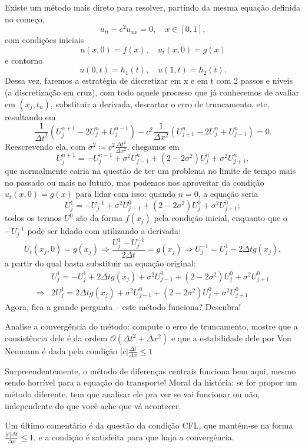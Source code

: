 \documentclass[../differential_methods.tex]{subfiles}
\begin{document}
Existe um método mais direto para resolver, partindo da mesma equação definida no começo,
\[
	u_{tt} - c^{2}u_{xx} = 0, \quad x\in [0, 1],
\]
com condições iniciais
\[
	u(x, 0) = f(x),\quad  u_{t}(x, 0) = g(x)
\]
e contorno
\[
	u(0, t) = h_1(t), \quad u(1, t)=h_2(t).
\]
Dessa vez, faremos a estratégia de discretizar em x e em t com 2 passos e níveis (a discretização em cruz), com todo aquele processo que já conhecemos de avaliar em \((x_{j}, t_{n})\), substituir a derivada, descartar o erro de truncamento, etc, resultando em
\[
	\frac{1}{\Delta t^{2}}(U_{j}^{n+1} - 2 U_{j}^{n} + U_{j}^{n-1}) - c^{2} \frac{1}{\Delta x^{2}}(U_{j+1}^{n}-2U_{j}^{n} + U_{j-1}^{n}) = 0.
\]
Reescrevendo ela, com \(\sigma^{2} \coloneqq c^{2}\frac{\Delta t^{2}}{\Delta x^{2}}\), chegamos em
\[
	U_{j}^{n+1} = -U_{j}^{n-1} + \sigma^{2}U_{j-1}^{n} + (2-2\sigma ^{2})U_{j}^{n} + \sigma^{2}U_{j+1}^{n},
\]
que normalmente cairia na questão de ter um problema no limite de tempo mais no passado ou mais no futuro, mas podemos nos aproveitar da condição \(u_t(x, 0) = g(x)\) para lidar com isso: quando \(n=0\), a equação seria
\[
	U_{j}^{1} = - U_{j}^{-1} + \sigma^{2} U_{j-1}^{0} + (2-2\sigma^{2})U_{j}^{0} + \sigma^{2}U_{j+1}^{0};
\]
todos os termos \(U^{0}\) são da forma \(f(x_{j})\) pela condição inicial, enquanto que o \(-U_{j}^{-1}\) pode ser lidado com utilizando a derivada:
\[
	U_t(x_{j}, 0) = g(x_{j}) \Rightarrow \frac{U_{j}^{1} - U_{j}^{-1}}{2\Delta t} = g(x_{j}) \Rightarrow U_{j}^{-1} = U_{j}^{1} - 2\Delta tg(x_{j}),
\]
a partir do qual basta substituir na equação original:
\begin{align*}
	            & U_{j}^{1} = - U_{j}^{1} + 2\Delta tg(x_{j}) + \sigma^{2} U_{j-1}^{0} + (2-2\sigma^{2})U_{j}^{0} + \sigma^{2}U_{j+1}^{0} \\
	\Rightarrow & \boxed{2U_{j}^{1} = 2\Delta tg(x_{j}) + \sigma^{2} U_{j-1}^{0} + (2-2\sigma^{2})U_{j}^{0} + \sigma^{2} U_{j+1}^{0}}
\end{align*}
Agora, fica a grande pergunta -- este método funciona? Descubra!
\begin{exr}
	Analise a convergência do método: compute o erro de truncamento, mostre que a consistência dele é da ordem \(\mathcal{O}(\Delta t^{2}+\Delta x^{2})\) e que a estabilidade dele por Von Neumann é dada pela condição \(| c |\frac{\Delta t}{\Delta x}\leq 1\)
\end{exr}
Surpreendentemente, o método de diferenças centrais funciona bem aqui, mesmo sendo horrível para a equação do transporte! Moral da história: se for propor um método diferente, tem que analisar ele pra ver se vai funcionar ou não, independente do que você ache que vá acontecer.

Um último comentário é da questão da condição CFL, que mantém-se na forma \(\frac{| c |\Delta t}{\Delta x} \leq 1\), e a condição é satisfeita para que haja a convergência.
\end{document}

